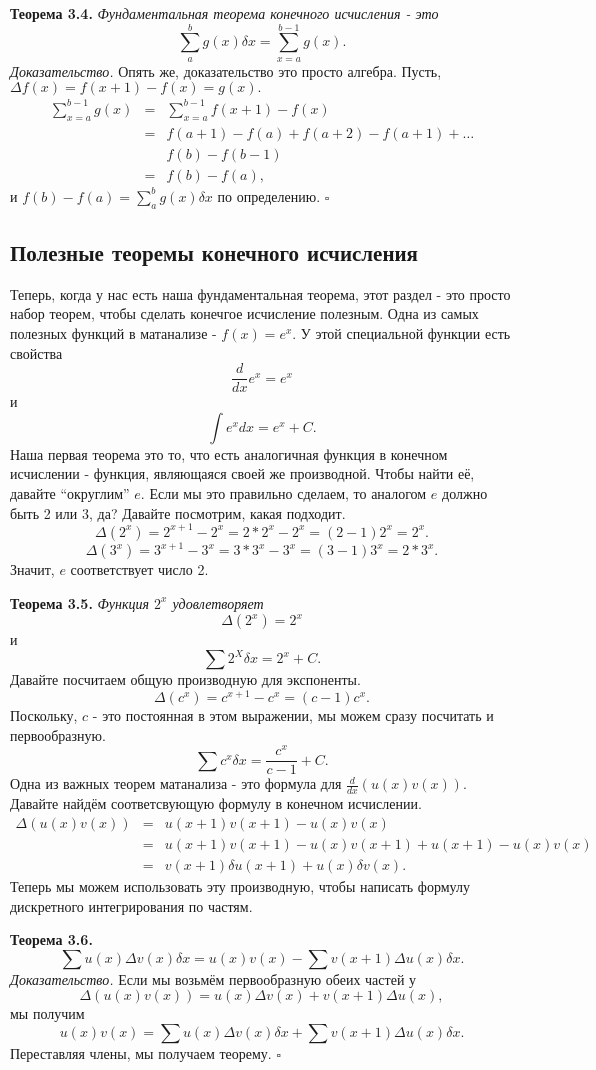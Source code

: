 \documentclass{article}
\begin{document}
\textbf{Теорема 3.4.} \textit{Фундаментальная теорема конечного исчисления - это}
$$\sum_a^b g(x) \delta x=\sum_{x=a}^{b-1} g(x).$$
\textit{Доказательство.} Опять же, доказательство это просто алгебра. Пусть, $\Delta f(x)=f(x+1)-f(x)=g(x).$
\begin{eqnarray*}
\sum_{x=a}^{b-1} g(x) & = & \sum_{x=a}^{b-1} f(x+1)-f(x) \\
& = & f(a+1)-f(a)+f(a+2)-f(a+1)+\dots \\
&  &  f(b)-f(b-1) \\
& = & f(b)-f(a),
\end{eqnarray*}
и $f(b)-f(a)=\sum_a^b g(x) \delta x$ по определению.
$\square$
\subsection{Полезные теоремы конечного исчисления}
Теперь, когда у нас есть наша фундаментальная теорема, этот раздел - это просто набор теорем, чтобы сделать конечгое исчисление полезным.
Одна из самых полезных функций в матанализе - $f(x)=e^x$. У этой специальной функции есть свойства
$$\frac{d}{dx} e^x=e^x$$
и
$$\int e^x dx=e^x+C.$$
Наша первая теорема это то, что есть аналогичная функция в конечном исчислении - функция, являющаяся своей же производной. Чтобы найти её, давайте ``округлим'' $e$. Если мы это правильно сделаем, то аналогом $e$ должно быть 2 или 3, да? Давайте посмотрим, какая подходит.
$$\Delta (2^x)=2^{x+1}-2^x=2*2^x-2^x=(2-1)2^x=2^x.$$
$$\Delta (3^x)=3^{x+1}-3^x=3*3^x-3^x=(3-1)3^x=2*3^x.$$
Значит, $e$ соответствует число 2.

\textbf{Теорема 3.5.} \textit{Функция $2^x$ удовлетворяет}
$$\Delta (2^x)=2^x$$
и
$$\sum 2^X \delta x=2^x+C.$$
Давайте посчитаем общую производную для экспоненты.
$$\Delta (c^x)=c^{x+1}-c^x=(c-1)c^x.$$
Поскольку, $c$ - это постоянная в этом выражении, мы можем сразу посчитать и первообразную.
$$\sum c^x \delta x=\frac{c^x}{c-1}+C.$$
Одна из важных теорем матанализа - это формула для $\frac{d}{dx}(u(x)v(x)).$ Давайте найдём соответсвующую формулу в конечном исчислении.
\begin{eqnarray*}
\Delta (u(x)v(x)) &=& u(x+1)v(x+1)-u(x)v(x) \\
& = & u(x+1)v(x+1)-u(x)v(x+1)+u(x+1)-u(x)v(x) \\
& = &  v(x+1)\delta u(x+1)+u(x)\delta v(x).
\end{eqnarray*}
Теперь мы можем использовать эту производную, чтобы написать формулу дискретного интегрирования по частям.

\textbf{Теорема 3.6.}
$$\sum u(x)\Delta v(x) \delta x=u(x)v(x)-\sum v(x+1)\Delta u(x) \delta x.$$ 
\textit{Доказательство.} Если мы возьмём первообразную обеих частей у
$$\Delta (u(x)v(x))=u(x)\Delta v(x)+v(x+1)\Delta u(x),$$
мы получим
$$u(x)v(x)=\sum u(x)\Delta v(x) \delta x + \sum v(x+1) \Delta u(x) \delta x.$$
Переставляя члены, мы получаем теорему.
$\square$
\end{document}
